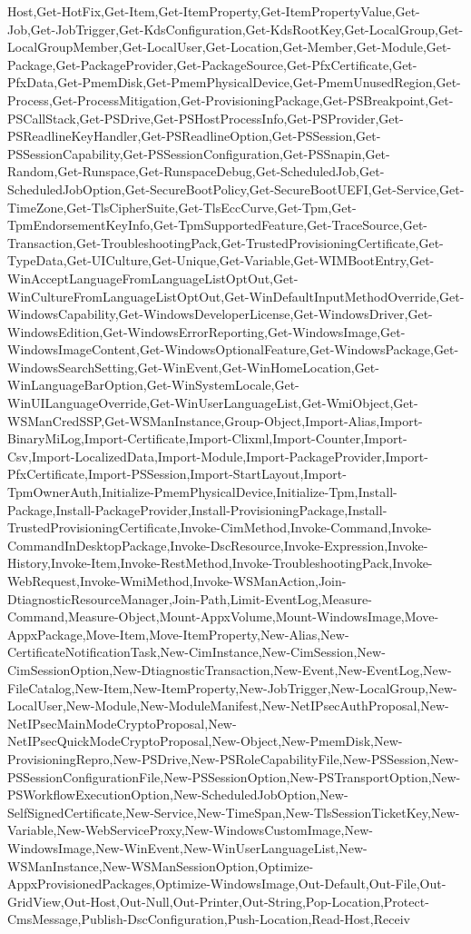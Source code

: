 {Host,Get-HotFix,Get-Item,Get-ItemProperty,Get-ItemPropertyValue,Get-Job,Get-JobTrigger,Get-KdsConfiguration,Get-KdsRootKey,Get-LocalGroup,Get-LocalGroupMember,Get-LocalUser,Get-Location,Get-Member,Get-Module,Get-Package,Get-PackageProvider,Get-PackageSource,Get-PfxCertificate,Get-PfxData,Get-PmemDisk,Get-PmemPhysicalDevice,Get-PmemUnusedRegion,Get-Process,Get-ProcessMitigation,Get-ProvisioningPackage,Get-PSBreakpoint,Get-PSCallStack,Get-PSDrive,Get-PSHostProcessInfo,Get-PSProvider,Get-PSReadlineKeyHandler,Get-PSReadlineOption,Get-PSSession,Get-PSSessionCapability,Get-PSSessionConfiguration,Get-PSSnapin,Get-Random,Get-Runspace,Get-RunspaceDebug,Get-ScheduledJob,Get-ScheduledJobOption,Get-SecureBootPolicy,Get-SecureBootUEFI,Get-Service,Get-TimeZone,Get-TlsCipherSuite,Get-TlsEccCurve,Get-Tpm,Get-TpmEndorsementKeyInfo,Get-TpmSupportedFeature,Get-TraceSource,Get-Transaction,Get-TroubleshootingPack,Get-TrustedProvisioningCertificate,Get-TypeData,Get-UICulture,Get-Unique,Get-Variable,Get-WIMBootEntry,Get-WinAcceptLanguageFromLanguageListOptOut,Get-WinCultureFromLanguageListOptOut,Get-WinDefaultInputMethodOverride,Get-WindowsCapability,Get-WindowsDeveloperLicense,Get-WindowsDriver,Get-WindowsEdition,Get-WindowsErrorReporting,Get-WindowsImage,Get-WindowsImageContent,Get-WindowsOptionalFeature,Get-WindowsPackage,Get-WindowsSearchSetting,Get-WinEvent,Get-WinHomeLocation,Get-WinLanguageBarOption,Get-WinSystemLocale,Get-WinUILanguageOverride,Get-WinUserLanguageList,Get-WmiObject,Get-WSManCredSSP,Get-WSManInstance,Group-Object,Import-Alias,Import-BinaryMiLog,Import-Certificate,Import-Clixml,Import-Counter,Import-Csv,Import-LocalizedData,Import-Module,Import-PackageProvider,Import-PfxCertificate,Import-PSSession,Import-StartLayout,Import-TpmOwnerAuth,Initialize-PmemPhysicalDevice,Initialize-Tpm,Install-Package,Install-PackageProvider,Install-ProvisioningPackage,Install-TrustedProvisioningCertificate,Invoke-CimMethod,Invoke-Command,Invoke-CommandInDesktopPackage,Invoke-DscResource,Invoke-Expression,Invoke-History,Invoke-Item,Invoke-RestMethod,Invoke-TroubleshootingPack,Invoke-WebRequest,Invoke-WmiMethod,Invoke-WSManAction,Join-DtiagnosticResourceManager,Join-Path,Limit-EventLog,Measure-Command,Measure-Object,Mount-AppxVolume,Mount-WindowsImage,Move-AppxPackage,Move-Item,Move-ItemProperty,New-Alias,New-CertificateNotificationTask,New-CimInstance,New-CimSession,New-CimSessionOption,New-DtiagnosticTransaction,New-Event,New-EventLog,New-FileCatalog,New-Item,New-ItemProperty,New-JobTrigger,New-LocalGroup,New-LocalUser,New-Module,New-ModuleManifest,New-NetIPsecAuthProposal,New-NetIPsecMainModeCryptoProposal,New-NetIPsecQuickModeCryptoProposal,New-Object,New-PmemDisk,New-ProvisioningRepro,New-PSDrive,New-PSRoleCapabilityFile,New-PSSession,New-PSSessionConfigurationFile,New-PSSessionOption,New-PSTransportOption,New-PSWorkflowExecutionOption,New-ScheduledJobOption,New-SelfSignedCertificate,New-Service,New-TimeSpan,New-TlsSessionTicketKey,New-Variable,New-WebServiceProxy,New-WindowsCustomImage,New-WindowsImage,New-WinEvent,New-WinUserLanguageList,New-WSManInstance,New-WSManSessionOption,Optimize-AppxProvisionedPackages,Optimize-WindowsImage,Out-Default,Out-File,Out-GridView,Out-Host,Out-Null,Out-Printer,Out-String,Pop-Location,Protect-CmsMessage,Publish-DscConfiguration,Push-Location,Read-Host,Receiv}

